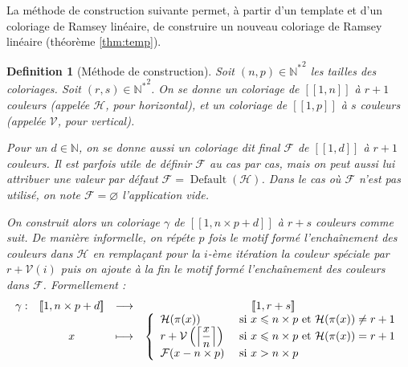 \documentclass{article}
\newtheorem{definition}{Definition}[section]
\DeclareMathOperator{\findef}{Default}
\begin{document}
La méthode de construction suivante permet, à partir d'un template et d'un coloriage de Ramsey linéaire, de construire un nouveau coloriage de Ramsey linéaire (théorème \ref{thm:temp}).

\begin{definition}[Méthode de construction]
Soit \((n, p) \in {\mathbb{N}^*}^2\) les tailles des coloriages. Soit \((r, s) \in {\mathbb{N}^*}^2\). On se donne un coloriage de \([\![1, n]\!]\) à \(r + 1\) couleurs (appelée \(\mathcal{H}\), pour horizontal), et un coloriage de \([\![1, p]\!]\) à \(s\) couleurs (appelée \(\mathcal{V}\), pour vertical).

Pour un \(d \in \mathbb{N}\), on se donne aussi un coloriage dit final \(\mathcal{F}\) de \([\![1, d]\!]\) à \(r + 1\) couleurs. Il est parfois utile de définir \(\mathcal{F}\) au cas par cas, mais on peut aussi lui attribuer une valeur par défaut \(\mathcal{F} = \findef(\mathcal{H})\). Dans le cas où \(\mathcal{F}\) n'est pas utilisé, on note \(\mathcal{F} = \varnothing\) l'application vide. 

On construit alors un coloriage \(\gamma\) de \([\![1, n \times p + d]\!]\) à \(r + s\) couleurs comme suit. De manière informelle, on répéte \(p\) fois le motif formé l'enchaînement des couleurs dans \(\mathcal{H}\) en remplaçant pour la \(i\)-ème itération la couleur spéciale par \(r + \mathcal{V}(i)\) puis on ajoute à la fin le motif formé l'enchaînement des couleurs dans \(\mathcal{F}\). Formellement :
\[\begin{array}{c c c c}
	\gamma: & [\![1, n \times p + d]\!]  & \longrightarrow &  [\![1, r + s]\!] \\
 	& x & \longmapsto & 
		\left\{\begin{array}{l l}
			\mathcal{H}(\pi(x)) & ~\text{si}~ x \leqslant n \times p ~\text{et}~ \mathcal{H}(\pi(x)) \neq r + 1 \\
			r + \mathcal{V}\left(\left\lceil \dfrac{x}{n} \right\rceil\right) & ~\text{si}~ x \leqslant n \times p ~\text{et}~ \mathcal{H}(\pi(x)) = r + 1 \\
			\mathcal{F}(x - n \times p) & ~\text{si}~ x > n \times p
		\end{array}\right.
\end{array}\]
\end{definition}
\end{document}
